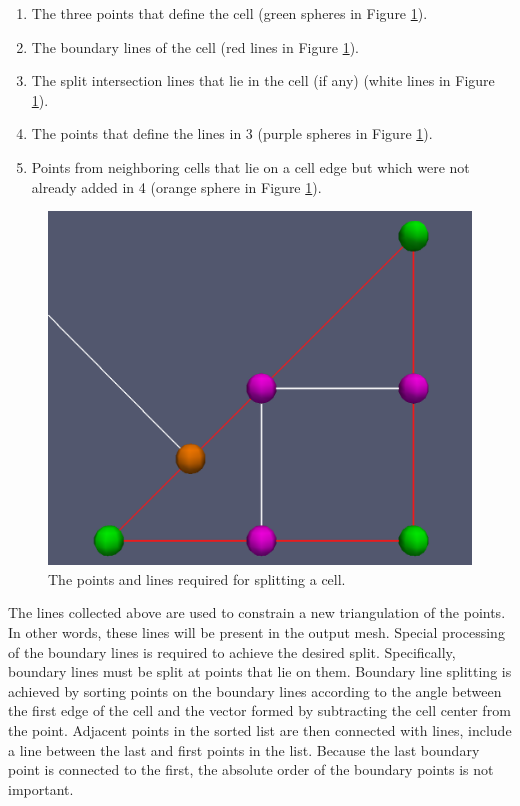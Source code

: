 \documentclass{InsightArticle}
\begin{document}
\begin{enumerate}
\item The three points that define the cell (green spheres in Figure \ref{fig:CellSplitSetup}).
\item The boundary lines of the cell (red lines in Figure \ref{fig:CellSplitSetup}).
\item The split intersection lines that lie in the cell (if any) (white lines in Figure \ref{fig:CellSplitSetup}).
\item The points that define the lines in 3 (purple spheres in Figure \ref{fig:CellSplitSetup}).
\item Points from neighboring cells that lie on a cell edge but which were not already added in 4 (orange sphere in Figure \ref{fig:CellSplitSetup}).
\end{enumerate}

\begin{figure}
\centering
\includegraphics[scale=0.25]{Figures/CellSplitSetup}
\caption{The points and lines required for splitting a cell.}
\label{fig:CellSplitSetup}
\end{figure}

The lines collected above are used to constrain a new triangulation of the points. In other words, these lines will be present in the output mesh. Special processing of the boundary lines is required to achieve the desired split. Specifically, boundary lines must be split at points that lie on them. Boundary line splitting is achieved by sorting points on the boundary lines according to the angle between the first edge of the cell and the vector formed by subtracting the cell center from the point. Adjacent points in the sorted list are then connected with lines, include a line between the last and first points in the list. Because the last boundary point is connected to the first, the absolute order of the boundary points is not important.
\end{document}
